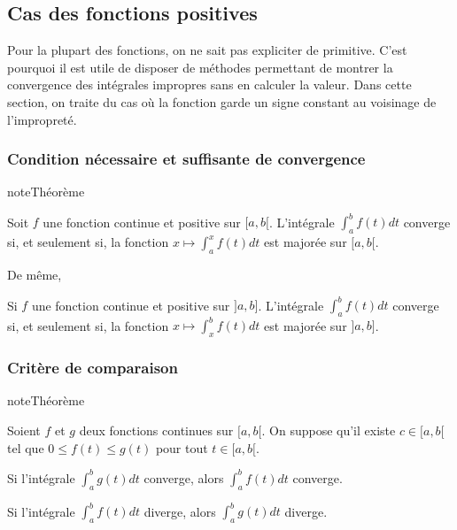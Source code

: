 \documentclass[letterpaper,10pt,french]{sphinxmanual}
\begin{document}
\subsection{Cas des fonctions positives}
\label{\detokenize{def:cas-des-fonctions-positives}}
\sphinxAtStartPar
Pour la plupart des fonctions, on ne sait pas expliciter de primitive. C’est pourquoi il est utile de disposer de méthodes permettant de montrer la convergence des intégrales impropres sans en calculer la valeur. Dans cette section, on traite du cas où la fonction garde un signe constant au voisinage de l’impropreté.


\subsubsection{Condition nécessaire et suffisante de convergence}
\label{\detokenize{def:condition-necessaire-et-suffisante-de-convergence}}
\begin{sphinxadmonition}{note}{Théorème}

\sphinxAtStartPar
Soit \(f\) une fonction continue et positive sur \([a, b[\). L’intégrale \(\int_a^b f(t)dt\) converge si, et seulement si, la fonction \(x\mapsto \int_a^x f(t)dt\) est majorée sur \([a, b[\).

\sphinxAtStartPar
De même,

\sphinxAtStartPar
Si \(f\) une fonction continue et positive sur \(]a, b]\). L’intégrale \(\int_a^b f(t)dt\) converge si, et seulement si, la fonction \(x\mapsto \int_x^b f(t)dt\) est majorée sur \(]a, b]\).
\end{sphinxadmonition}


\subsubsection{Critère de comparaison}
\label{\detokenize{def:critere-de-comparaison}}
\begin{sphinxadmonition}{note}{Théorème}

\sphinxAtStartPar
Soient \(f\) et \(g\) deux fonctions continues sur \([a, b[\). On suppose qu’il existe \(c\in [a, b[\) tel que \(0\leq f(t)\leq g(t)\) pour tout \(t\in [a, b[\).

\sphinxAtStartPar
Si l’intégrale \(\int_a^b g(t)dt\) converge, alors \(\int_a^b f(t)dt\) converge.

\sphinxAtStartPar
Si l’intégrale \(\int_a^b f(t)dt\) diverge, alors \(\int_a^b g(t)dt\) diverge.
\end{sphinxadmonition}
\end{document}
